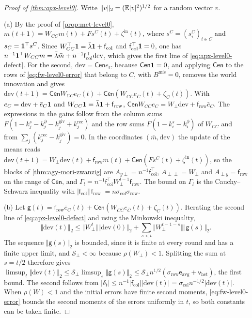 \begin{proof}[Proof of \cref{thm:apx-level0}]
Write $\Vert v\Vert_2=(\mathbb{E}\lvert v\rvert^2)^{1/2}$ for a random vector $v$.

(a) By the proof of \cref{prop:met-level0}, $m(t+1)=W_{CC}m(t)+Fs^C(t)+\zeta^{\mathrm{in}}(t)$, where $s^C=(s^C_i)_{i\in C}$ and $s_C=\mathbf{1}^\top s^C$. Since $W_{CC}^\top\mathbf{1}=\bar\lambda\mathbf{1}+\mathsf f_{\mathrm{col}}$ and $\mathsf f_{\mathrm{col}}^\top\mathbf{1}=0$, one has $n^{-1}\mathbf{1}^\top W_{CC}m=\bar\lambda\bar m+n^{-1}\mathsf f_{\mathrm{col}}^\top\mathrm{dev}$, which gives the first line of \eqref{eq:apx-level0-defect}. For the second, $\mathrm{dev}=\mathsf{Cen}e_C$ because $\mathsf{Cen}\mathbf{1}=0$, and applying $\mathsf{Cen}$ to the rows of \eqref{eq:fw-level0-error} that belong to $C$, with $B^{\mathrm{mis}}=0$, removes the world innovation and gives $\mathrm{dev}(t+1)=\mathsf{Cen}W_{CC}e_C(t)+\mathsf{Cen}(W_{C\bar C}e_{\bar C}(t)+\zeta_C(t))$. With $e_C=\mathrm{dev}+\bar e_C\mathbf{1}$ and $W_{CC}\mathbf{1}=\bar\lambda\mathbf{1}+\mathsf f_{\mathrm{row}}$, $\mathsf{Cen}W_{CC}e_C=W_\perp\mathrm{dev}+\mathsf f_{\mathrm{row}}\bar e_C$. The expressions in the gains follow from the column sums $F(1-k^s_j-k^\partial_j-k^{\mathrm{giv}}_j+k^{\mathrm{rec}}_j)$ and the row sums $F(1-k^s_i-k^\partial_i)$ of $W_{CC}$ and from $\sum_j(k^{\mathrm{rec}}_j-k^{\mathrm{giv}}_j)=0$. In the coordinates $(\bar m,\mathrm{dev})$ the update of the means reads $\mathrm{dev}(t+1)=W_\perp\mathrm{dev}(t)+\mathsf f_{\mathrm{row}}\bar m(t)+\mathsf{Cen}(Fs^C(t)+\zeta^{\mathrm{in}}(t))$, so the blocks of \cref{thm:agy-mori-zwanzig} are $A_{y\perp}=n^{-1}\mathsf f_{\mathrm{col}}^\top$, $A_{\perp\perp}=W_\perp$ and $A_{\perp y}=\mathsf f_{\mathrm{row}}$ on the range of $\mathsf{Cen}$, and $\Gamma_l=n^{-1}\mathsf f_{\mathrm{col}}^\top W_\perp^{l-1}\mathsf f_{\mathrm{row}}$. The bound on $\Gamma_l$ is the Cauchy--Schwarz inequality with $\lvert\mathsf f_{\mathrm{col}}\rvert\lvert\mathsf f_{\mathrm{row}}\rvert=n\sigma_{\mathrm{col}}\sigma_{\mathrm{row}}$.

(b) Let $\mathsf g(t)=\mathsf f_{\mathrm{row}}\bar e_C(t)+\mathsf{Cen}(W_{C\bar C}e_{\bar C}(t)+\zeta_C(t))$. Iterating the second line of \eqref{eq:apx-level0-defect} and using the Minkowski inequality,
\begin{equation*}
\Vert\mathrm{dev}(t)\Vert_2\le\Vert W_\perp^t\Vert\Vert\mathrm{dev}(0)\Vert_2+\sum_{s<t}\Vert W_\perp^{t-1-s}\Vert\Vert\mathsf g(s)\Vert_2 .
\end{equation*}
The sequence $\Vert\mathsf g(s)\Vert_2$ is bounded, since it is finite at every round and has a finite upper limit, and $\mathcal S_\perp<\infty$ because $\rho(W_\perp)<1$. Splitting the sum at $s=t/2$ therefore gives $\limsup_t\Vert\mathrm{dev}(t)\Vert_2\le\mathcal S_\perp\limsup_s\Vert\mathsf g(s)\Vert_2\le\mathcal S_\perp n^{1/2}(\sigma_{\mathrm{row}}\mathsf e_{\mathrm{avg}}+\mathsf v_{\mathrm{het}})$, the first bound. The second follows from $\lvert\delta_t\rvert\le n^{-1}\lvert\mathsf f_{\mathrm{col}}\rvert\lvert\mathrm{dev}(t)\rvert=\sigma_{\mathrm{col}}n^{-1/2}\lvert\mathrm{dev}(t)\rvert$. When $\rho(W)<1$ and the initial errors have finite second moments, \eqref{eq:fw-level0-error} bounds the second moments of the errors uniformly in $t$, so both constants can be taken finite.


\end{proof}
